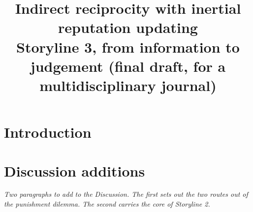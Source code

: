 \documentclass[11pt]{article}
\title{\large Indirect reciprocity with inertial reputation updating\\[0.3em]
\normalsize Storyline 3, from information to judgement (final draft, for a multidisciplinary journal)}
\date{}
\begin{document}
\maketitle

\section*{Introduction}











\section*{Discussion additions}
\textit{Two paragraphs to add to the Discussion. The first sets out the two routes out of the punishment dilemma. The second carries the core of Storyline 2.}







\end{document}
